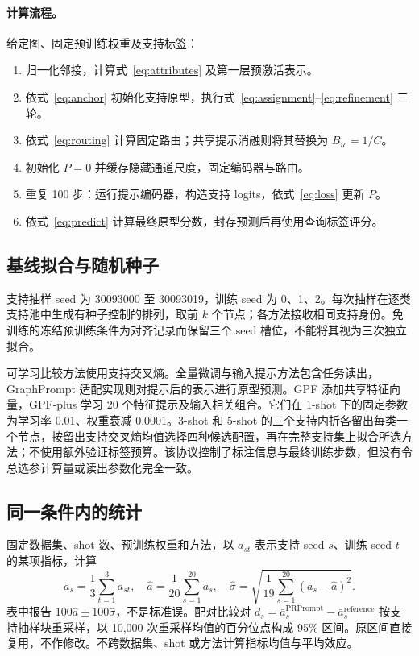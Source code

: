 \paragraph{计算流程。}
给定图、固定预训练权重及支持标签：
\begin{enumerate}
\item 归一化邻接，计算式~\eqref{eq:attributes} 及第一层预激活表示。
\item 依式~\eqref{eq:anchor} 初始化支持原型，执行式~\eqref{eq:assignment}--\eqref{eq:refinement} 三轮。
\item 依式~\eqref{eq:routing} 计算固定路由；共享提示消融则将其替换为 $B_{ic}=1/C$。
\item 初始化 $P=0$ 并缓存隐藏通道尺度，固定编码器与路由。
\item 重复 100 步：运行提示编码器，构造支持 logits，依式~\eqref{eq:loss} 更新 $P$。
\item 依式~\eqref{eq:predict} 计算最终原型分数，封存预测后再使用查询标签评分。
\end{enumerate}

\subsection{基线拟合与随机种子}
支持抽样 seed 为 30093000 至 30093019，训练 seed 为 0、1、2。每次抽样在逐类支持池中生成有种子控制的排列，取前 $k$ 个节点；各方法接收相同支持身份。免训练的冻结预训练条件为对齐记录而保留三个 seed 槽位，不能将其视为三次独立拟合。

可学习比较方法使用支持交叉熵。全量微调与输入提示方法包含任务读出，GraphPrompt 适配实现则对提示后的表示进行原型预测。GPF 添加共享特征向量，GPF-plus 学习 20 个特征提示及输入相关组合。它们在 1-shot 下的固定参数为学习率 0.01、权重衰减 0.0001。3-shot 和 5-shot 的三个支持内折各留出每类一个节点，按留出支持交叉熵均值选择四种候选配置，再在完整支持集上拟合所选方法；不使用额外验证标签预算。该协议控制了标注信息与最终训练步数，但没有令总选参计算量或读出参数化完全一致。

\subsection{同一条件内的统计}
固定数据集、shot 数、预训练权重和方法，以 $a_{st}$ 表示支持 seed $s$、训练 seed $t$ 的某项指标，计算
\begin{equation}
\bar a_s=\frac13\sum_{t=1}^{3}a_{st},\quad
\widehat a=\frac1{20}\sum_{s=1}^{20}\bar a_s,\quad
\widehat\sigma=\sqrt{\frac1{19}\sum_{s=1}^{20}(\bar a_s-\widehat a)^2}.
\label{eq:stats}
\end{equation}
表中报告 $100\widehat a\pm100\widehat\sigma$，不是标准误。配对比较对 $d_s=\bar a_s^{\mathrm{PRPrompt}}-\bar a_s^{\mathrm{reference}}$ 按支持抽样块重采样，以 10,000 次重采样均值的百分位点构成 95\% 区间。原区间直接复用，不作修改。不跨数据集、shot 或方法计算指标均值与平均效应。


